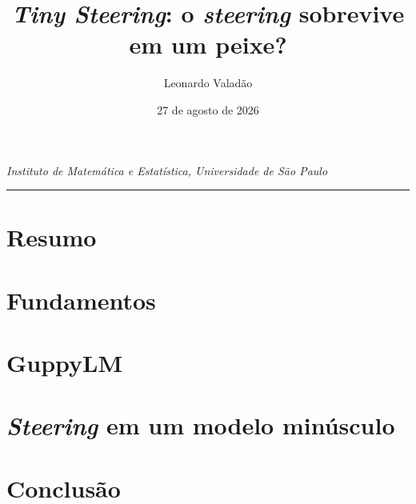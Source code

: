 \documentclass[12pt]{article}
\begin{document}

\title{\textit{Tiny Steering}: o \textit{steering} sobrevive em um peixe?} %
\author{Leonardo Valadão} %
\date{27 de agosto de 2026}
\maketitle

{%
\centering
\textit{Instituto de Matemática e Estatística, Universidade de São Paulo} %
\par
}
\hrule
\vspace{.2in}

\section*{Resumo}


\section{Fundamentos}


\section{GuppyLM}


\section{\textit{Steering} em um modelo minúsculo}


\section{Conclusão}




\end{document}
